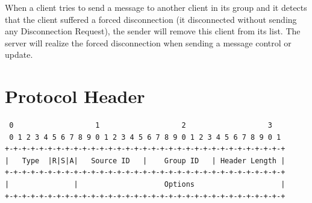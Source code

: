 \documentclass{article}
\begin{document}
When a client tries to send a message to another client in its group and it detects that the client suffered a forced disconnection (it disconnected without sending any Disconnection Request), the sender will remove this client from its list. The server will realize the forced disconnection when sending a message control or update.

\clearpage

\section{Protocol Header}

\begin{verbatim}
 0                   1                   2                   3  
 0 1 2 3 4 5 6 7 8 9 0 1 2 3 4 5 6 7 8 9 0 1 2 3 4 5 6 7 8 9 0 1
+-+-+-+-+-+-+-+-+-+-+-+-+-+-+-+-+-+-+-+-+-+-+-+-+-+-+-+-+-+-+-+-+
|   Type  |R|S|A|   Source ID   |    Group ID   | Header Length |
+-+-+-+-+-+-+-+-+-+-+-+-+-+-+-+-+-+-+-+-+-+-+-+-+-+-+-+-+-+-+-+-+
|               |                    Options                    |
+-+-+-+-+-+-+-+-+-+-+-+-+-+-+-+-+-+-+-+-+-+-+-+-+-+-+-+-+-+-+-+-+
\end{verbatim}
\end{document}
